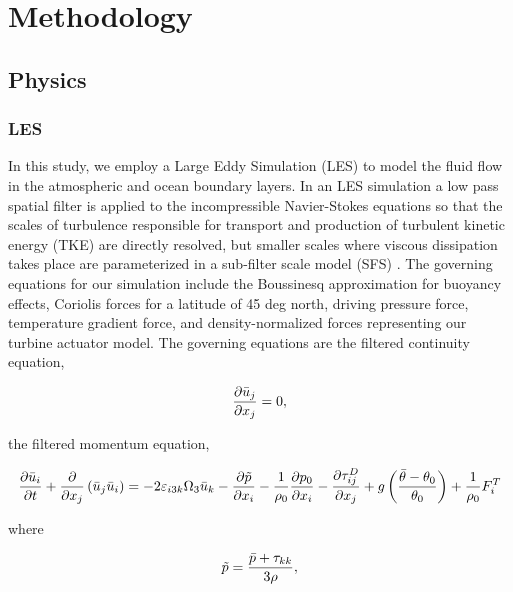 \section{Methodology}

\subsection{Physics}


\subsubsection{LES}
In this study, we employ a Large Eddy Simulation (LES) to model the fluid flow in the atmospheric and ocean boundary layers.  In an LES simulation a low pass spatial filter is applied to the incompressible Navier-Stokes equations so that the scales of turbulence responsible for transport and production of turbulent kinetic energy (TKE) are directly resolved, but smaller scales where viscous dissipation takes place are parameterized in a sub-filter scale model (SFS) \cite{moeng_large-eddy-simulation_1984}.  The governing equations for our simulation include the Boussinesq approximation for buoyancy effects, Coriolis forces for a latitude of 45 deg north, driving pressure force, temperature gradient force, and density-normalized forces representing our turbine actuator model.  The governing equations are the filtered continuity equation,

\begin{equation}
   \label{filtered_continuity}
   \frac{\partial \bar{u}_j}{\partial x_j} = 0,
\end{equation}

the filtered momentum equation,

\begin{equation}
   \label{filtered_momentum}
   \frac{\partial \bar{u}_i}{\partial t} 
   + \frac{\partial}{\partial x_j}\left(\bar{u}_j \bar{u}_i \right)
   = -2\varepsilon_{i3k}\Omega_{3} \bar{u}_k 
   - \frac{\partial \tilde{p}}{\partial x_i} 
   - \frac{1}{\rho_0} \frac{\partial p_0}{\partial x_i}
   - \frac{\partial \tau^D_{ij}}{\partial x_j} 
   + g \left( \frac{\bar{\theta} - \theta_0}{\theta_0} \right)
   + \frac{1}{\rho_0}F^T_i
\end{equation}

where

\begin{equation}
   \label{eq:modified_pressure}
   \tilde{p} = \frac{\bar{p} + \tau_{kk}}{3 \rho},
\end{equation}

